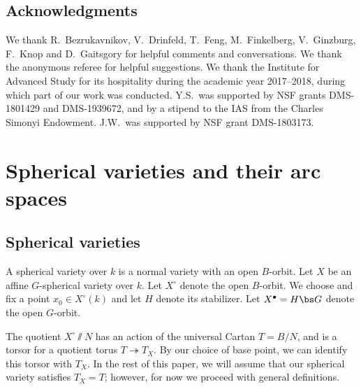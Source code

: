 \documentclass[final]{amsart}
\theoremstyle{remark}
\theoremstyle{definition}
\numberwithin{equation}{section}
\begin{document}
\subsection{Acknowledgments}

We thank R.~Bezrukavnikov, V.~Drinfeld, T.~Feng, M.~Finkelberg, V.~Ginzburg, F.~Knop and D.~Gaitsgory for helpful comments and conversations. We thank the anonymous referee for helpful suggestions. We thank the Institute for Advanced Study for its hospitality during the academic year 2017--2018, during which part of our work was conducted. Y.S.~was supported by NSF grants DMS-1801429 and DMS-1939672, and by a stipend to the IAS from the Charles Simonyi Endowment.
J.W.~was supported by NSF grant DMS-1803173. 

\section{Spherical varieties and their arc spaces}
\label{section-spherical}

\subsection{Spherical varieties}
\label{sect:spherical}

A spherical variety over $k$ is a normal variety with an open $B$-orbit. 
Let $X$ be an affine $G$-spherical variety over $k$. Let $X^\circ$ denote the open $B$-orbit. We choose and fix a point $x_0 \in X^\circ(k)$ and let $H$ denote its stabilizer.
Let $X^\bullet= H\bs G $ denote the open $G$-orbit. 

The quotient $X^\circ\sslash N$ has an action of the universal Cartan $T=B/N$, and is a torsor for a quotient torus $T\twoheadrightarrow T_X$. By our choice of base point, we can identify this torsor with $T_X$. In the rest of this paper, we will assume that our spherical variety satisfies $T_X=T$; however, for now we proceed with general definitions.
\end{document}
